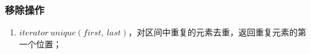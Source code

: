 \subsubsection{移除操作}
\begin{enumerate}
    \item $iterator\ unique(first,\ last)$，对区间中重复的元素去重，返回重复元素的第一个位置；
\end{enumerate}